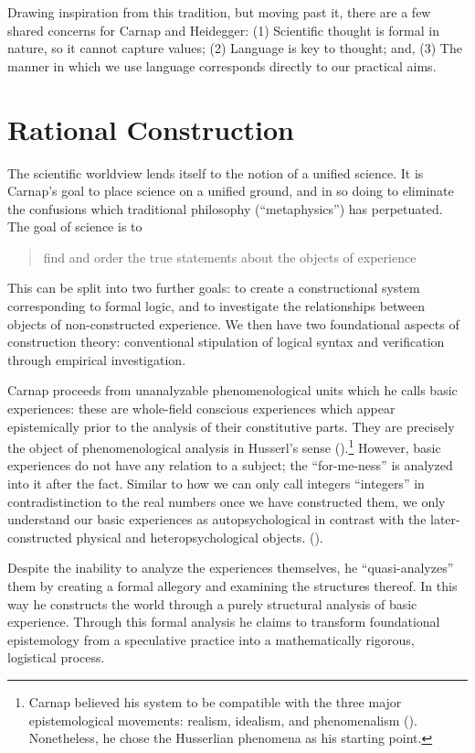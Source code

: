 \documentclass[leqno, 12pt]{turabian-researchpaper}
\begin{document}
	Drawing inspiration from this tradition, but moving past it, there are a few
	shared concerns for Carnap and Heidegger: (1) Scientific thought is formal in nature,
	so it cannot capture values; (2) Language is key to thought; and, (3) The manner
	in which we use language corresponds directly to our practical aims.

	\section{Rational Construction}

	The scientific worldview lends itself to the notion of a unified science. It is
	Carnap's goal to place science on a unified ground, and in so doing to
	eliminate the confusions which traditional philosophy (\enquote{metaphysics}) has
	perpetuated. The goal of science is to \blockquote[{}]{find and order the true statements about the objects of experience}.
	This can be split into two further goals: to create a constructional system
	corresponding to formal logic, and to investigate the relationships between objects
	of non-constructed experience. We then have two foundational aspects of
	construction theory: conventional stipulation of logical syntax and verification
	through empirical investigation.

	Carnap proceeds from unanalyzable phenomenological units which he calls basic experiences:
	these are whole-field conscious experiences which appear epistemically prior
	to the analysis of their constitutive parts. They are precisely the object of phenomenological
	analysis in Husserl's sense ().\footnote{Carnap
	believed his system to be compatible with the three major epistemological
	movements: realism, idealism, and phenomenalism ().
	Nonetheless, he chose the Husserlian phenomena as his starting point.} However,
	basic experiences do not have any relation to a subject; the \enquote{for-me-ness}
	is analyzed into it after the fact. Similar to how we can only call integers
	\enquote{integers} in contradistinction to the real numbers once we have constructed
	them, we only understand our basic experiences as autopsychological in
	contrast with the later-constructed physical and heteropsychological objects. ().

	Despite the inability to analyze the experiences themselves, he \enquote{quasi-analyzes}
	them by creating a formal allegory and examining the structures thereof. In
	this way he constructs the world through a purely structural analysis of basic
	experience. Through this formal analysis he claims to transform foundational epistemology
	from a speculative practice into a mathematically rigorous, logistical process.
\end{document}
